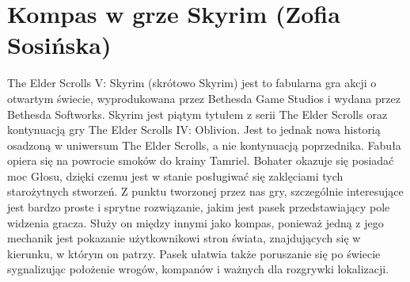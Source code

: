 \section{Kompas w grze Skyrim (Zofia Sosińska)}\label{chap:skrm}

The Elder Scrolls V: Skyrim (skrótowo Skyrim) jest to fabularna gra akcji o otwartym świecie, wyprodukowana przez Bethesda Game Studios i wydana przez Bethesda Softworks. Skyrim jest piątym tytułem z serii The Elder Scrolls oraz kontynuacją gry The Elder Scrolls IV: Oblivion. Jest to jednak nowa historią osadzoną w uniwersum The Elder Scrolls, a nie kontynuacją poprzednika. Fabuła opiera się na powrocie smoków do krainy Tamriel. Bohater okazuje się posiadać moc Głosu, dzięki czemu jest w stanie posługiwać się zaklęciami tych starożytnych stworzeń.
	Z punktu tworzonej przez nas gry, szczególnie interesujące jest  bardzo proste i sprytne rozwiązanie, jakim jest pasek przedstawiający pole widzenia gracza. Służy on między innymi jako kompas, ponieważ jedną z jego mechanik jest pokazanie użytkownikowi stron świata, znajdujących się w kierunku, w którym on patrzy. Pasek ułatwia także poruszanie się po świecie sygnalizując położenie wrogów, kompanów i ważnych dla rozgrywki lokalizacji.



